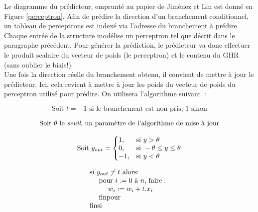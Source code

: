 \documentclass[a4paper]{article}
\begin{document}
Le diagramme du prédicteur, emprunté au papier de Jiménez et Lin est donné en Figure \ref{perceptron}. Afin de prédire la direction d'un branchement conditionnel, un tableau de perceptrons est indexé via l'adresse du branchement à prédire. Chaque entrée de la structure modélise un perceptron tel que décrit dans le paragraphe précédent. Pour générer la prédiction, le prédicteur va donc effectuer le produit scalaire du vecteur de poids (le perceptron) et le contenu du GHR (sans oublier le biais!) \\

Une fois la direction réelle du branchement obtenu, il convient de mettre à jour le prédicteur. Ici, cela revient à mettre à jour les poids du vecteur de poids du perceptron utilisé pour prédire. On utilisera l'algorithme suivant~:

\begin{equation*}
\text{Soit~} t = -1 \text{~si le branchement est non-pris, 1 sinon}
\end{equation*}

\vspace*{-20px}

\begin{equation*}
\text{Soit~} \theta \text{~le \textit{seuil}, un paramètre de l'algorithme de mise à jour}
\end{equation*}

\vspace*{-20px}

\begin{equation*}
\text{Soit~} y_{out}=\left\{
\begin{array}{@{}ll@{}}
1, & \text{si~} y > \theta \\
0, & \text{si~} -\theta \leq y \leq \theta \\
-1, & \text{si~} y < \theta
\end{array}\right.
\end{equation*} 

\begin{equation*}
\begin{array}{@{}ll@{}}
\text{si~}y_{out} \neq t \text{~alors:} \\
  \text{~~~~pour $i := 0$ à $n$, faire}: \\
    \text{~~~~~~~~} w_i := w_i + t.x_i \\
  \text{~~~~finpour} \\
\text{finsi}
\end{array}
\end{equation*}
\end{document}

